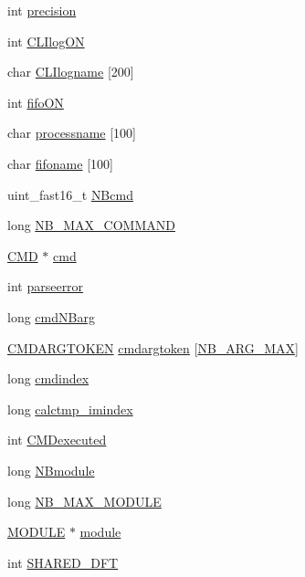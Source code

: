 \begin{DoxyCompactItemize}
int \hyperlink{structDATA_a7b6fce0fc9e6046ffa57b30b8bcd0d1f}{precision}
\item 
int \hyperlink{structDATA_abfc40a5bf0093716bcc793aca3ec678c}{C\+L\+Ilog\+O\+N}
\item 
char \hyperlink{structDATA_aa491474d93756c181862fb907c777b78}{C\+L\+Ilogname} \mbox{[}200\mbox{]}
\item 
int \hyperlink{structDATA_a37b44a7ef0d3d29f33bf3700ec28665e}{fifo\+O\+N}
\item 
char \hyperlink{structDATA_a58978653cfb98eaf9b9007cb992cc0e4}{processname} \mbox{[}100\mbox{]}
\item 
char \hyperlink{structDATA_ac3b98b39c316089481ab31820a1f4b21}{fifoname} \mbox{[}100\mbox{]}
\item 
uint\+\_\+fast16\+\_\+t \hyperlink{structDATA_a9d4aa8a6a88242efc8f498ea5ff355f8}{N\+Bcmd}
\item 
long \hyperlink{structDATA_afc7d56480cf2e6f4b91ed95be0466d44}{N\+B\+\_\+\+M\+A\+X\+\_\+\+C\+O\+M\+M\+A\+N\+D}
\item 
\hyperlink{structCMD}{C\+M\+D} $\ast$ \hyperlink{structDATA_af0e58ce879fa3017d9131eed5a90cc96}{cmd}
\item 
int \hyperlink{structDATA_a04c14ba8ea1844e3f68888dca0fe3519}{parseerror}
\item 
long \hyperlink{structDATA_a6facd114f508ec4fcb52003b9f93d123}{cmd\+N\+Barg}
\item 
\hyperlink{structCMDARGTOKEN}{C\+M\+D\+A\+R\+G\+T\+O\+K\+E\+N} \hyperlink{structDATA_a1072fcd97dbe8660a3b3d7d54b21b300}{cmdargtoken} \mbox{[}\hyperlink{CLIcore_8h_a0a6b220d813ff622977cf6d7f1f5ffa6}{N\+B\+\_\+\+A\+R\+G\+\_\+\+M\+A\+X}\mbox{]}
\item 
long \hyperlink{structDATA_af462cdcbd42307c3dacf0891ba4dd8ca}{cmdindex}
\item 
long \hyperlink{structDATA_a11b6d226ab6612bc5a418abb89b56feb}{calctmp\+\_\+imindex}
\item 
int \hyperlink{structDATA_a51e21d55f2eeba8ae6c9f9f02311eeef}{C\+M\+Dexecuted}
\item 
long \hyperlink{structDATA_a4ef780e882fa0d3ad2462be54dc58f4e}{N\+Bmodule}
\item 
long \hyperlink{structDATA_aa3ce94f1c13e2a2b3acc31caca1f3b95}{N\+B\+\_\+\+M\+A\+X\+\_\+\+M\+O\+D\+U\+L\+E}
\item 
\hyperlink{structMODULE}{M\+O\+D\+U\+L\+E} $\ast$ \hyperlink{structDATA_a0a1527cfaff533ba10df8cfdf519002a}{module}
\item 
int \hyperlink{structDATA_a64d5b0ed5d5cedf11ff69ebf8d30dc20}{S\+H\+A\+R\+E\+D\+\_\+\+D\+F\+T}

\end{DoxyCompactItemize}
